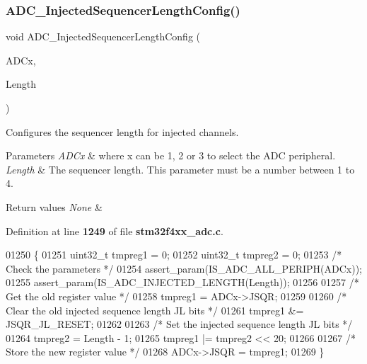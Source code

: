 \subsubsection{A\+D\+C\+\_\+\+Injected\+Sequencer\+Length\+Config()}
{\footnotesize\ttfamily void A\+D\+C\+\_\+\+Injected\+Sequencer\+Length\+Config (\begin{DoxyParamCaption}\item[{\textbf{ A\+D\+C\+\_\+\+Type\+Def} $\ast$}]{A\+D\+Cx,  }\item[{uint8\+\_\+t}]{Length }\end{DoxyParamCaption})}



Configures the sequencer length for injected channels. 


\begin{DoxyParams}{Parameters}
{\em A\+D\+Cx} & where x can be 1, 2 or 3 to select the A\+DC peripheral. \\
\hline
{\em Length} & The sequencer length. This parameter must be a number between 1 to 4. \\
\hline
\end{DoxyParams}

\begin{DoxyRetVals}{Return values}
{\em None} & \\
\hline
\end{DoxyRetVals}


Definition at line \textbf{ 1249} of file \textbf{ stm32f4xx\+\_\+adc.\+c}.


\begin{DoxyCode}
01250 \{
01251   uint32\_t tmpreg1 = 0;
01252   uint32\_t tmpreg2 = 0;
01253   \textcolor{comment}{/* Check the parameters */}
01254   assert_param(IS_ADC_ALL_PERIPH(ADCx));
01255   assert_param(IS_ADC_INJECTED_LENGTH(Length));
01256   
01257   \textcolor{comment}{/* Get the old register value */}
01258   tmpreg1 = ADCx->JSQR;
01259   
01260   \textcolor{comment}{/* Clear the old injected sequence length JL bits */}
01261   tmpreg1 &= JSQR_JL_RESET;
01262   
01263   \textcolor{comment}{/* Set the injected sequence length JL bits */}
01264   tmpreg2 = Length - 1; 
01265   tmpreg1 |= tmpreg2 << 20;
01266   
01267   \textcolor{comment}{/* Store the new register value */}
01268   ADCx->JSQR = tmpreg1;
01269 \}
\end{DoxyCode}
\mbox{\label{group__ADC__Group6_ga07a942613088ab3ecfc3d97a20475920}} 
